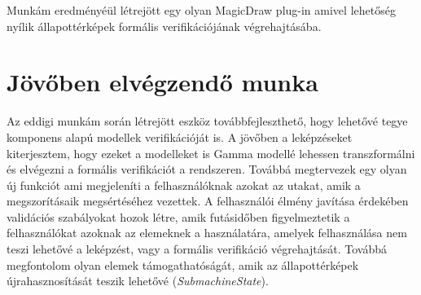 Munkám eredményéül létrejött egy olyan MagicDraw plug-in amivel lehetőség nyílik állapottérképek formális verifikációjának végrehajtásába.

\section{Jövőben elvégzendő munka}

Az eddigi munkám során létrejött eszköz továbbfejleszthető, hogy lehetővé tegye komponens alapú modellek verifikációját is. A jövőben a leképzéseket kiterjesztem, hogy ezeket a modelleket is Gamma modellé lehessen transzformálni és elvégezni a formális verifikációt a rendszeren. Továbbá megtervezek egy olyan új funkciót ami megjeleníti a felhasználóknak azokat az utakat, amik a megszorításaik megsértéséhez vezettek. A felhasználói élmény javítása érdekében validációs szabályokat hozok létre, amik futásidőben figyelmeztetik a felhasználókat azoknak az elemeknek a használatára, amelyek felhasználása nem teszi lehetővé a leképzést, vagy a formális verifikáció végrehajtását. Továbbá megfontolom olyan elemek támogathatóságát, amik az állapottérképek újrahasznosítását teszik lehetővé (\emph{SubmachineState}).


